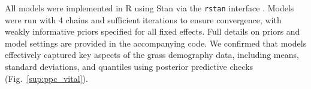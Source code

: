 \documentclass[12pt]{article}\usepackage[]{graphicx}\usepackage[dvipsnames]{xcolor}
\newcommand{\tom}[2]{{\color{red}{#1}}\footnote{\textit{\color{red}{#2}}}}
\begin{document}
All models were implemented in R \citep{RCoreTeam} using Stan via the \texttt{rstan} interface \citep{Rstan}. 
Models were run with 4 chains and sufficient iterations to ensure convergence, with weakly informative priors specified for all fixed effects. 
Full details on priors and model settings are provided in the accompanying code.
We confirmed that models effectively captured key aspects of the grass demography data, including means, standard deviations, and quantiles  using posterior predictive checks (Fig.~\ref{sup:ppc_vital}).

\end{document}
